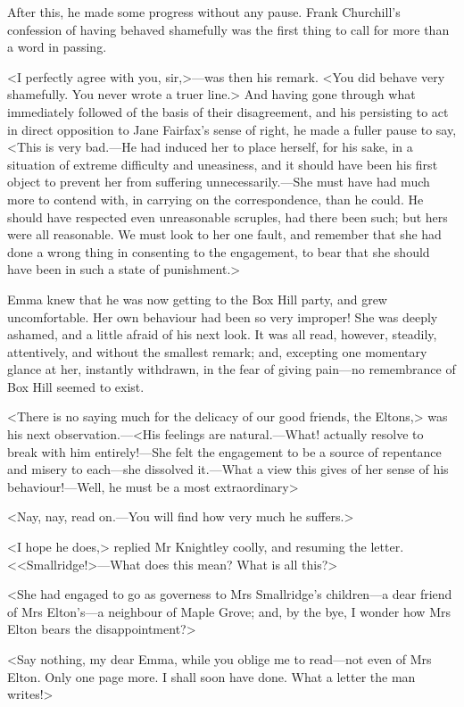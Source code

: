 After this, he made some progress without any pause. Frank Churchill's confession of having behaved shamefully was the first thing to call for more than a word in passing.

<I perfectly agree with you, sir,>—was then his remark. <You did behave very shamefully. You never wrote a truer line.> And having gone through what immediately followed of the basis of their disagreement, and his persisting to act in direct opposition to Jane Fairfax's sense of right, he made a fuller pause to say, <This is very bad.—He had induced her to place herself, for his sake, in a situation of extreme difficulty and uneasiness, and it should have been his first object to prevent her from suffering unnecessarily.—She must have had much more to contend with, in carrying on the correspondence, than he could. He should have respected even unreasonable scruples, had there been such; but hers were all reasonable. We must look to her one fault, and remember that she had done a wrong thing in consenting to the engagement, to bear that she should have been in such a state of punishment.>

Emma knew that he was now getting to the Box Hill party, and grew uncomfortable. Her own behaviour had been so very improper! She was deeply ashamed, and a little afraid of his next look. It was all read, however, steadily, attentively, and without the smallest remark; and, excepting one momentary glance at her, instantly withdrawn, in the fear of giving pain—no remembrance of Box Hill seemed to exist.

<There is no saying much for the delicacy of our good friends, the Eltons,> was his next observation.—<His feelings are natural.—What! actually resolve to break with him entirely!—She felt the engagement to be a source of repentance and misery to each—she dissolved it.—What a view this gives of her sense of his behaviour!—Well, he must be a most extraordinary\longdash>

<Nay, nay, read on.—You will find how very much he suffers.>

<I hope he does,> replied Mr Knightley coolly, and resuming the letter. <<Smallridge!>—What does this mean? What is all this?>

<She had engaged to go as governess to Mrs Smallridge's children—a dear friend of Mrs Elton's—a neighbour of Maple Grove; and, by the bye, I wonder how Mrs Elton bears the disappointment?>

<Say nothing, my dear Emma, while you oblige me to read—not even of Mrs Elton. Only one page more. I shall soon have done. What a letter the man writes!>

